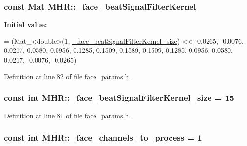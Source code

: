 \hypertarget{namespace_m_h_r_a846528ce2187823d06b73caadf751570}{
\subsubsection[{\+\_\+face\+\_\+beat\+Signal\+Filter\+Kernel}]{\setlength{\rightskip}{0pt plus 5cm}const Mat M\+H\+R\+::\+\_\+face\+\_\+beat\+Signal\+Filter\+Kernel}}\label{namespace_m_h_r_a846528ce2187823d06b73caadf751570}
{\bfseries Initial value\+:}
\begin{DoxyCode}
= (Mat\_<double>(1, \hyperlink{namespace_m_h_r_a7f9a1a070d8e2c3eb72d79c71b2f468a}{\_face\_beatSignalFilterKernel\_size}) <<
                                              -0.0265, -0.0076, 0.0217, 0.0580, 0.0956,
                                              0.1285, 0.1509, 0.1589, 0.1509, 0.1285,
                                              0.0956, 0.0580, 0.0217, -0.0076, -0.0265)
\end{DoxyCode}


Definition at line 82 of file face\+\_\+params.\+h.

\hypertarget{namespace_m_h_r_a7f9a1a070d8e2c3eb72d79c71b2f468a}{
\subsubsection[{\+\_\+face\+\_\+beat\+Signal\+Filter\+Kernel\+\_\+size}]{\setlength{\rightskip}{0pt plus 5cm}const int M\+H\+R\+::\+\_\+face\+\_\+beat\+Signal\+Filter\+Kernel\+\_\+size = 15}}\label{namespace_m_h_r_a7f9a1a070d8e2c3eb72d79c71b2f468a}


Definition at line 81 of file face\+\_\+params.\+h.

\hypertarget{namespace_m_h_r_ac3a2dbcaefbcbb5814108c711ebd1fe1}{
\subsubsection[{\+\_\+face\+\_\+channels\+\_\+to\+\_\+process}]{\setlength{\rightskip}{0pt plus 5cm}const int M\+H\+R\+::\+\_\+face\+\_\+channels\+\_\+to\+\_\+process = 1}}\label{namespace_m_h_r_ac3a2dbcaefbcbb5814108c711ebd1fe1}


